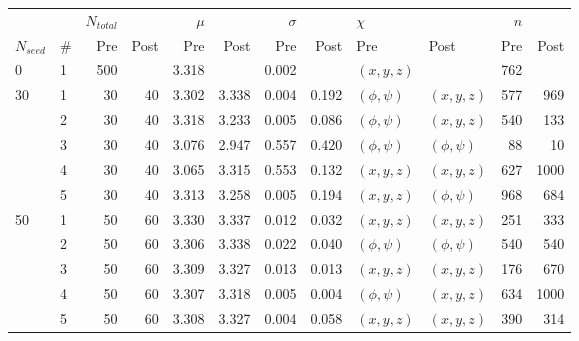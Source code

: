 \begin{table}
    \centering
\begin{tabular}{|ll|rr|rr|rr|ll|rr|}
\hline
   &   & $N_{total}$ & & $\mu$ & & $\sigma$ & & $\chi$ &  & $n$ & \\
 $N_{seed}$  &   \#  &         Pre & Post &   Pre &  Post &      Pre &  Post &  Pre & Post & Pre & Post \\
\hline\hline
0  & 1 &         500 &      & 3.318 &       &    0.002 &       &     $(x, y, z)$ &              & 762 &      \\
\hline
30 & 1 &          30 &   40 & 3.302 & 3.338 &    0.004 & 0.192 &  $(\phi, \psi)$ &     $(x, y, z)$ & 577 &  969 \\
   & 2 &          30 &   40 & 3.318 & 3.233 &    0.005 & 0.086 &  $(\phi, \psi)$ &     $(x, y, z)$ & 540 &  133 \\
   & 3 &          30 &   40 & 3.076 & 2.947 &    0.557 & 0.420 &  $(\phi, \psi)$ &  $(\phi, \psi)$ &  88 &   10 \\
   & 4 &          30 &   40 & 3.065 & 3.315 &    0.553 & 0.132 &     $(x, y, z)$ &     $(x, y, z)$ & 627 & 1000 \\
   & 5 &          30 &   40 & 3.313 & 3.258 &    0.005 & 0.194 &     $(x, y, z)$ &  $(\phi, \psi)$ & 968 &  684 \\
   \hline
50 & 1 &          50 &   60 & 3.330 & 3.337 &    0.012 & 0.032 &     $(x, y, z)$ &     $(x, y, z)$ & 251 &  333 \\
   & 2 &          50 &   60 & 3.306 & 3.338 &    0.022 & 0.040 &  $(\phi, \psi)$ &  $(\phi, \psi)$ & 540 &  540 \\
   & 3 &          50 &   60 & 3.309 & 3.327 &    0.013 & 0.013 &     $(x, y, z)$ &     $(x, y, z)$ & 176 &  670 \\
   & 4 &          50 &   60 & 3.307 & 3.318 &    0.005 & 0.004 &  $(\phi, \psi)$ &     $(x, y, z)$ & 634 & 1000 \\
   & 5 &          50 &   60 & 3.308 & 3.327 &    0.004 & 0.058 &     $(x, y, z)$ &     $(x, y, z)$ & 390 &  314 \\
\hline
\end{tabular}

    \label{tab:ala1_best_params}
\end{table}

